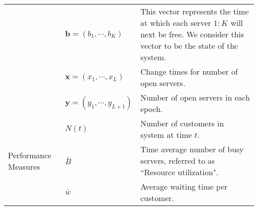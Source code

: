 \begin{tabular}{|l|l|p{10cm}|}
& $\mathbf{b} = (b_1, \cdots, b_K )$ & This vector represents the time at which each server $1:K$ will next be free. We consider this vector to be the state of the system. \\ 

& $\mathbf{x} = (x_1, \cdots, x_L )$ & Change times for number of open servers. \\ 

& $\mathbf{y} = (y_1, \cdots, y_{L+1} )$ & Number of open servers in each epoch. \\



\hline

\multirow{4}{3cm}{Performance Measures}

& $N(t)$ & Number of customers in system at time $t$. \\
& $\bar{B}$ & Time average number of busy servers, referred to as ``Resource utilization". \\
& $\bar{w}$ & Average waiting time per customer. \\

\hline

\end{tabular}